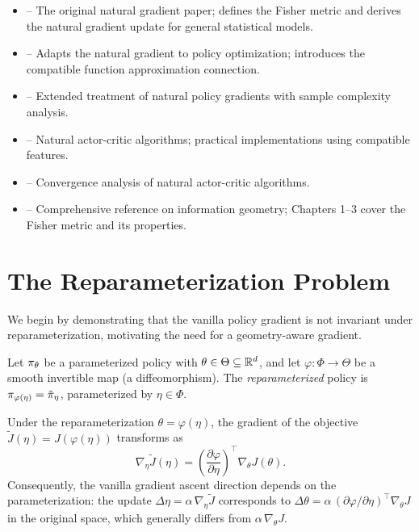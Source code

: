 \documentclass[11pt,a4paper]{article}
\begin{document}
\begin{itemize}
  \item \citet{amari1998} -- The original natural gradient paper;
    defines the Fisher metric and derives the natural gradient update
    for general statistical models.
  \item \citet{kakade2002} -- Adapts the natural gradient to policy
    optimization; introduces the compatible function approximation
    connection.
  \item \citet[Chapter 2]{kakade2003} -- Extended treatment of
    natural policy gradients with sample complexity analysis.
  \item \citet{peters2008} -- Natural actor-critic algorithms;
    practical implementations using compatible features.
  \item \citet{bhatnagar2009} -- Convergence analysis of natural
    actor-critic algorithms.
  \item \citet{amari2016} -- Comprehensive reference on information
    geometry; Chapters 1--3 cover the Fisher metric and its properties.
\end{itemize}

\section{The Reparameterization Problem}

We begin by demonstrating that the vanilla policy gradient is not
invariant under reparameterization, motivating the need for a
geometry-aware gradient.

\begin{definition}[Reparameterization]
\label{def:reparam}
Let $\pi_\theta$ be a parameterized policy with $\theta \in \Theta
\subseteq \mathbb{R}^d$, and let $\varphi : \Phi \to \Theta$ be a smooth
invertible map (a diffeomorphism). The \emph{reparameterized} policy is
$\pi_{\varphi(\eta)} = \tilde{\pi}_\eta$, parameterized by
$\eta \in \Phi$.
\end{definition}

\begin{proposition}
\label{prop:non-covariance}
Under the reparameterization $\theta = \varphi(\eta)$, the gradient of
the objective $\tilde{J}(\eta) = J(\varphi(\eta))$ transforms as
\[
  \nabla_\eta \tilde{J}(\eta) = \left(\frac{\partial \varphi}{\partial \eta}\right)^\top \nabla_\theta J(\theta).
\]
Consequently, the vanilla gradient ascent direction depends on the
parameterization: the update $\Delta\eta = \alpha\, \nabla_\eta
\tilde{J}$ corresponds to $\Delta\theta = \alpha\,
(\partial\varphi/\partial\eta)^\top \nabla_\theta J$ in the original
space, which generally differs from $\alpha\, \nabla_\theta J$.
\end{proposition}
\end{document}
